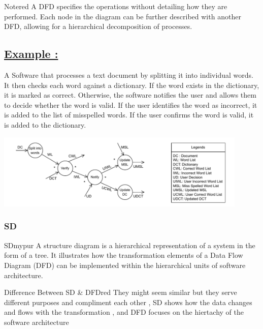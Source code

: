 \vspace{0.5cm}

\begin{prettyBox}{Note}{red}
    A DFD specifies the operations without detailing how they are performed. Each node in the diagram can be further described with another DFD, allowing for a hierarchical decomposition of processes.
\end{prettyBox}

\vspace{0.5cm}

\subsection*{\underline{Example :}}
A Software that processes a text document by splitting it into individual
words. It then checks each word against a dictionary. If the word exists in
the dictionary, it is marked as correct. Otherwise, the software notifies the
user and allows them to decide whether the word is valid. If the user 
identifies the word as incorrect, it is added to the list of misspelled words.
If the user confirms the word is valid, it is added to the dictionary.

\begin{center}
\includegraphics[width=0.9\textwidth]{Chapters/Diagram/DFD/dfd2.drawio.pdf}
\end{center}

\subsubsection{SD}

\begin{prettyBox}{SD}{mypur}
A structure diagram is a hierarchical representation of a system in the
form of a tree. It illustrates how the transformation elements of a Data Flow
Diagram (DFD) can be implemented within the hierarchical units of software architecture.
\end{prettyBox}

\vspace{0.25cm}

\begin{prettyBox}{Difference Between SD \& DFD}{red}
They might seem similar but they serve different purposes and compliment each other ,
SD shows how the data changes and flows with the transformation , and DFD focuses on the hiertachy
of the software architecture
\end{prettyBox}

